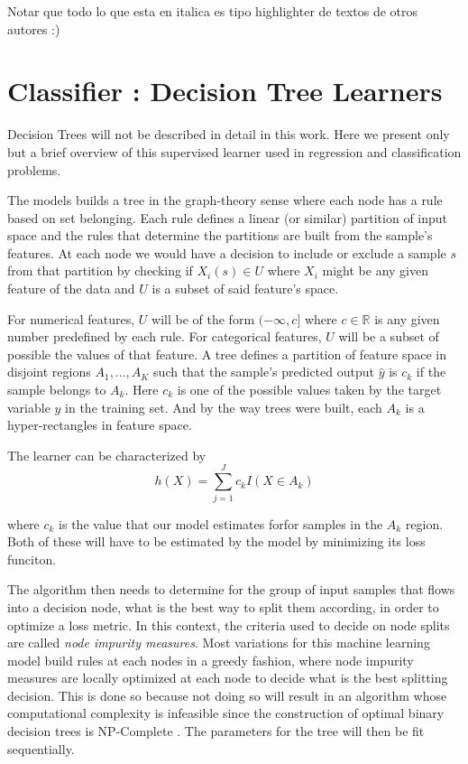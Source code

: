Notar que todo lo que esta en italica es tipo highlighter de textos de otros autores :)

\section{Classifier : Decision Tree Learners}

Decision Trees will not be described in detail in this work. Here we present only but a brief overview of this supervised learner used in regression and classification problems.

The models builds a tree in the graph-theory sense where each node has a rule based on set belonging. Each rule defines a linear (or similar) partition of input space and the rules that determine the partitions are built from the sample's features. At each node we would have a decision to include or exclude a sample $s$ from that partition by checking if $X_i(s) \in U$ where $X_i$ might be any given feature of the data and $U$ is a subset of said feature's space.

For numerical features, $U$ will be of the form $(-\infty,c]$ where $c \in \mathbb{R}$ is any given number predefined by each rule. For categorical features, $U$ will be a subset of possible the values of that feature. A tree defines a partition of feature space in disjoint regions $A_1,...,A_K$ such that the sample's predicted output $\hat{y}$ is $c_k$ if the sample belongs to $A_k$. Here $c_k$ is one of the possible values taken by the target variable $y$ in the training set. And by the way trees were built, each $A_k$ is a hyper-rectangles in feature space.

The learner can be characterized by 
\[
h(X) = \sum_{j=1}^J c_k I(X \in A_k)
\]\label{equation-decisionTreeModel}

where $c_k$ is the value that our model estimates forfor samples in the $A_k$ region. Both of these will have to be estimated by the model by minimizing its loss funciton.

The algorithm then needs to determine for the group of input samples that flows into a decision node, what is the best way to split them according, in order to optimize a loss metric. In this context, the criteria used to decide on node splits are called \textit{node impurity measures}. Most variations for this machine learning model build rules at each nodes in a greedy fashion, where node impurity measures are locally optimized at each node to decide what is the best splitting decision. This is done so because not doing so will result in an algorithm whose computational complexity is infeasible since the construction of optimal binary decision trees is NP-Complete \cite{decisionTreesNP}. The parameters for the tree will then be fit sequentially.

